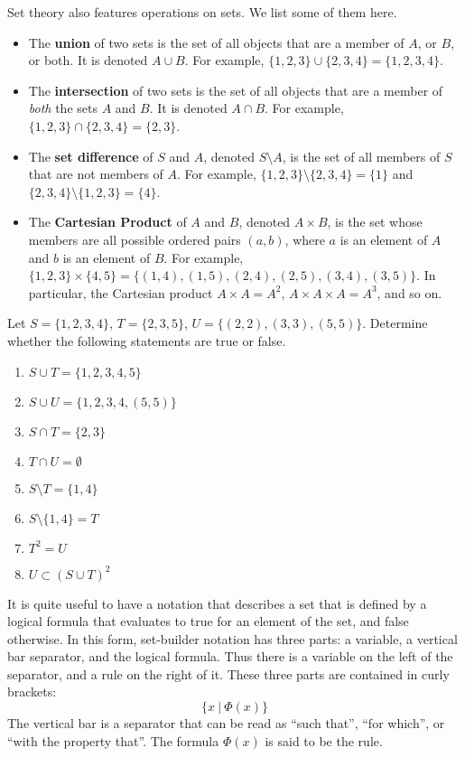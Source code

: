 Set theory also features operations on sets. We list some of them here.
\begin{itemize}
    \item The \textbf{union} of two sets is the set of all objects that are a member of $A$, or $B$, or both. It is denoted $A \cup B$. For example, $\{1, 2, 3\} \cup \{2, 3, 4\} = \{1, 2, 3, 4\}$.
    \item The \textbf{intersection} of two sets is the set of all objects that are a member of \textit{both} the sets $A$ and $B$. It is denoted $A \cap B$. For example, $\{1, 2, 3\} \cap \{2, 3, 4\} = \{2, 3\}$.
    \item The \textbf{set difference} of $S$ and $A$, denoted $S \setminus A$, is the set of all members of $S$ that are not members of $A$. For example, $\{1, 2, 3\} \setminus \{2, 3, 4\} = \{1\}$ and $\{2, 3, 4\} \setminus \{1, 2, 3\} = \{4\}$.
    \item The \textbf{Cartesian Product} of $A$ and $B$, denoted $A \times B$, is the set whose members are all possible ordered pairs $(a, b)$, where $a$ is an element of $A$ and $b$ is an element of $B$. For example, $\{1, 2, 3\} \times \{4, 5\} = \{(1, 4), (1, 5), (2, 4), (2, 5), (3, 4), (3, 5)\}$. In particular, the Cartesian product $A \times A = A^2$, $A\times A \times A = A^3$, and so on.
\end{itemize}

\newpage

\begin{exercise}
    Let $S = \{1, 2, 3, 4\}$, $T = \{2, 3, 5\}$, $U = \{(2, 2), (3, 3), (5, 5)\}$. Determine whether the following statements are true or false.
    \begin{enumerate}[label=(\alph*)]
        \item $S \cup T = \{1, 2, 3, 4, 5\}$
        \item $S \cup U = \{1, 2, 3, 4, (5, 5)\}$
        \item $S \cap T = \{2, 3\}$
        \item $T \cap U = \emptyset$
        \item $S \setminus T = \{1, 4\}$
        \item $S \setminus \{1, 4\} = T$
        \item $T^2 = U$
        \item $U \subset (S \cup T)^2$
    \end{enumerate}
\end{exercise}
It is quite useful to have a notation that describes a set that is defined by a logical formula that evaluates to true for an element of the set, and false otherwise. In this form, set-builder notation has three parts: a variable, a vertical bar separator, and the logical formula. Thus there is a variable on the left of the separator, and a rule on the right of it. These three parts are contained in curly brackets:
\[
    \{x \ | \ \Phi(x)\}
\]
The vertical bar is a separator that can be read as ``such that'', ``for which'', or ``with the property that''. The formula $\Phi(x)$ is said to be the rule.

